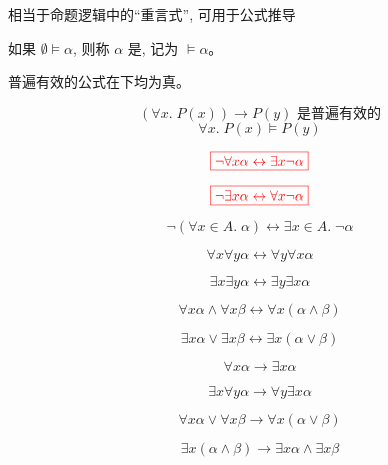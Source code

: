 \begin{frame}{}
  \begin{center}
    相当于命题逻辑中的``重言式'', 可用于公式推导
  \end{center}

  \begin{definition}
    如果 $\emptyset \models \alpha$, 则称 $\alpha$ 是,
    记为 $\models \alpha$。
  \end{definition}

  \pause
  \vspace{0.60cm}
  \begin{center}
    普遍有效的公式在下均为真。

    \[
      (\forall x.\; P(x)) \to P(y) \text{ 是普遍有效的}
    \]
    \[
      \forall x.\; P(x) \models P(y)
    \]
  \end{center}
\end{frame}

\begin{frame}{}
  \[
    \textcolor{red}{\boxed{\lnot \forall x \alpha \leftrightarrow \exists x \lnot \alpha}}
  \]

  \[
    \textcolor{red}{\boxed{\lnot \exists x \alpha \leftrightarrow \forall x \lnot \alpha}}
  \]

  \[
    \lnot (\forall x \in A.\; \alpha) \leftrightarrow \exists x \in A.\; \lnot \alpha
  \]
\end{frame}

\begin{frame}{}
  \[
    \forall x \forall y \alpha \leftrightarrow \forall y \forall x \alpha
  \]

  \[
    \exists x \exists y \alpha \leftrightarrow \exists y \exists x \alpha
  \]
\end{frame}

\begin{frame}{}
  \[
    \forall x \alpha \land \forall x \beta
      \leftrightarrow \forall x (\alpha \land \beta)
  \]

  \[
    \exists x \alpha \lor \exists x \beta
      \leftrightarrow \exists x (\alpha \lor \beta)
  \]
\end{frame}

\begin{frame}{}
  \[
    \forall x \alpha \to \exists x \alpha
  \]

  \[
    \exists x \forall y \alpha \to \forall y \exists x \alpha
  \]

  \pause
  \[
    \forall x \alpha \lor \forall x \beta \to \forall x (\alpha \lor \beta)
  \]

  \[
    \exists x (\alpha \land \beta) \to \exists x \alpha \land \exists x \beta
  \]
\end{frame}
